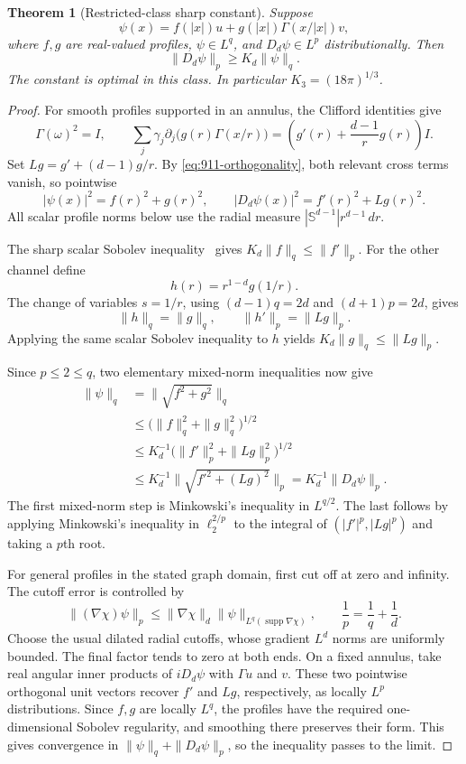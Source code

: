 \documentclass[11pt,a4paper]{article}
\newtheorem{theorem}{Theorem}[section]
\theoremstyle{remark}
\begin{document}
\begin{theorem}[Restricted-class sharp constant]\label{thm:911partial}
Suppose
\[
 \psi(x)=f(|x|)u+g(|x|)\Gamma(x/|x|)v,
\]
where $f,g$ are real-valued profiles, $\psi\in L^q$, and
$D_d\psi\in L^p$ distributionally. Then
\[
 \|D_d\psi\|_p\ge K_d\|\psi\|_q.
\]
The constant is optimal in this class. In particular
$K_3=(18\pi)^{1/3}$.
\end{theorem}

\begin{proof}
For smooth profiles supported in an annulus, the Clifford identities give
\[
 \Gamma(\omega)^2=I,
 \qquad
 \sum_j\gamma_j\partial_j
 \bigl(g(r)\Gamma(x/r)\bigr)
   =\left(g'(r)+\frac{d-1}{r}g(r)\right)I.
\]
Set $Lg=g'+(d-1)g/r$. By \eqref{eq:911-orthogonality}, both relevant cross
terms vanish, so pointwise
\begin{equation}\label{eq:911-pointwise}
 |\psi(x)|^2=f(r)^2+g(r)^2,
 \qquad |D_d\psi(x)|^2=f'(r)^2+Lg(r)^2.
\end{equation}
All scalar profile norms below use the radial measure
$|\mathbb S^{d-1}|r^{d-1}\,dr$.

The sharp scalar Sobolev inequality~\cite{Talenti1976} gives
$K_d\|f\|_q\le\|f'\|_p$. For the other channel define
\[
 h(r)=r^{1-d}g(1/r).
\]
The change of variables $s=1/r$, using $(d-1)q=2d$ and $(d+1)p=2d$,
gives
\[
 \|h\|_q=\|g\|_q,
 \qquad \|h'\|_p=\|Lg\|_p.
\]
Applying the same scalar Sobolev inequality to $h$ yields
$K_d\|g\|_q\le\|Lg\|_p$.

Since $p\le2\le q$, two elementary mixed-norm inequalities now give
\begin{align*}
 \|\psi\|_q
 &=\|\sqrt{f^2+g^2}\|_q\\
 &\le\bigl(\|f\|_q^2+\|g\|_q^2\bigr)^{1/2}\\
 &\le K_d^{-1}\bigl(\|f'\|_p^2+\|Lg\|_p^2\bigr)^{1/2}\\
 &\le K_d^{-1}\|\sqrt{f'^2+(Lg)^2}\|_p
 =K_d^{-1}\|D_d\psi\|_p.
\end{align*}
The first mixed-norm step is Minkowski's inequality in $L^{q/2}$. The
last follows by applying Minkowski's inequality in $\ell^{2/p}_2$ to the
integral of $(|f'|^p,|Lg|^p)$ and taking a $p$th root.

For general profiles in the stated graph domain, first cut off at zero
and infinity. The cutoff error is controlled by
\[
 \|(\nabla\chi)\psi\|_p
 \le\|\nabla\chi\|_d
       \|\psi\|_{L^q(\operatorname{supp}\nabla\chi)},
 \qquad \frac1p=\frac1q+\frac1d.
\]
Choose the usual dilated radial cutoffs, whose gradient $L^d$ norms are
uniformly bounded. The final factor tends to zero at both ends. On a
fixed annulus, take real angular inner products of $iD_d\psi$ with
$\Gamma u$ and $v$. These two pointwise orthogonal unit vectors recover
$f'$ and $Lg$, respectively, as locally $L^p$ distributions. Since
$f,g$ are locally $L^q$, the profiles have the required one-dimensional
Sobolev regularity, and smoothing there preserves their form.
This gives convergence in $\|\psi\|_q+\|D_d\psi\|_p$, so the inequality
passes to the limit.


\end{proof}
\end{document}
